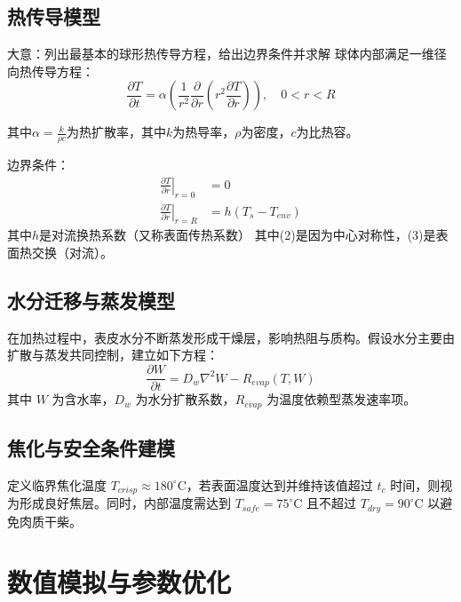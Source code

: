 \documentclass[12pt]{article}
\begin{document}
\subsection{热传导模型}
大意：列出最基本的球形热传导方程，给出边界条件并求解
球体内部满足一维径向热传导方程：
\begin{equation}
\frac{\partial T}{\partial t} = \alpha \left( \frac{1}{r^2} \frac{\partial}{\partial r}\left(r^2 \frac{\partial T}{\partial r} \right) \right), \quad 0 < r < R
\label{eq:1}
\end{equation}
\par 其中\(\alpha = \frac{k}{\rho c}\)为热扩散率，其中$k$为热导率，\(\rho\)为密度，$c$为比热容。
\par 边界条件：
\begin{align}
\left.\frac{\partial T}{\partial r}\right|_{r=0} &= 0 \\
\left.\frac{\partial T}{\partial r}\right|_{r=R} &= h(T_s - T_{env})
\end{align}
其中$h$是对流换热系数（又称表面传热系数）
其中(2)是因为中心对称性，(3)是表面热交换（对流）。

\subsection{水分迁移与蒸发模型}
在加热过程中，表皮水分不断蒸发形成干燥层，影响热阻与质构。假设水分主要由扩散与蒸发共同控制，建立如下方程：
\begin{equation}
\frac{\partial W}{\partial t} = D_w \nabla^2 W - R_{evap}(T, W)
\end{equation}
其中 $W$ 为含水率，$D_w$ 为水分扩散系数，$R_{evap}$ 为温度依赖型蒸发速率项。

\subsection{焦化与安全条件建模}

定义临界焦化温度 $T_{crisp} \approx 180^\circ$C，若表面温度达到并维持该值超过 $t_c$ 时间，则视为形成良好焦层。同时，内部温度需达到 $T_{safe} = 75^\circ$C 且不超过 $T_{dry} = 90^\circ$C 以避免肉质干柴。

\section{数值模拟与参数优化}
\end{document}
